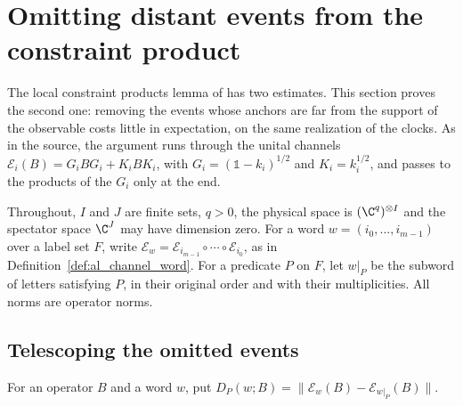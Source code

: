 
\section{Omitting distant events from the constraint product}
\label{sec:al_channel_word_omission}

The local constraint products lemma of \cite[Section~10]{OpenAI2026AreaLaw}
has two estimates. This section proves the second one: removing the events
whose anchors are far from the support of the observable costs little in
expectation, on the same realization of the clocks. As in the source, the
argument runs through the unital channels
$\mathcal E_i(B)=G_iBG_i+K_iBK_i$, with $G_i=(\mathbb 1-k_i)^{1/2}$ and
$K_i=k_i^{1/2}$, and passes to the products of the $G_i$ only at the end.

Throughout, $I$ and $J$ are finite sets, $q>0$, the physical space is
$(\C^q)^{\otimes I}$ and the spectator space $\C^J$ may have dimension zero.
For a word $w=(i_0,\ldots,i_{m-1})$ over a label set $F$, write
$\mathcal E_w=\mathcal E_{i_{m-1}}\circ\cdots\circ\mathcal E_{i_0}$, as in
Definition~\ref{def:al_channel_word}. For a predicate $P$ on $F$, let
$w|_P$ be the subword of letters satisfying $P$, in their original order and
with their multiplicities. All norms are operator norms.

\subsection{Telescoping the omitted events}

\begin{definition}
    \label{def:al_channel_word_omission_defect}
    \leanok
    For an operator $B$ and a word $w$, put
    $D_P(w;B)=\|\mathcal E_w(B)-\mathcal E_{w|_P}(B)\|$.
\end{definition}

